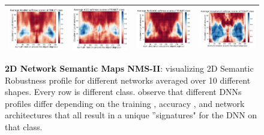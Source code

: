 \begin{figure}[h]
\begin{tabular}{||c|c|c|c||}
\includegraphics[width = 4cm]{supimages/nms2d/AlexNet_toilet_Average.pdf}&
\includegraphics[width = 4cm]{supimages/nms2d/VGG_toilet_Average.pdf}&
\includegraphics[width = 4cm]{supimages/nms2d/ResNet50_toilet_Average.pdf}&
\includegraphics[width = 4cm]{supimages/nms2d/Inceptionv3_toilet_Average.pdf} \\
\hline
\end{tabular}
   \caption{\small \textbf{2D Network Semantic Maps NMS-II}: visualizing 2D Semantic Robustness profile for different networks averaged over 10 different shapes. Every row is different class. observe that different DNNs profiles differ depending on the training , accuracy , and network architectures that all result in a unique ''signatures" for the DNN on that class.}
   \vspace{-8pt}
   \label{fig:nsm2d-2}
\end{figure}



